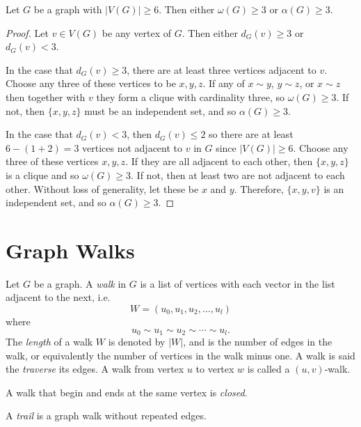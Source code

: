 \begin{thm}
    Let $G$ be a graph with $|V(G)| \geq 6$. Then either $\omega(G) \geq 3$ or $\alpha(G) \geq 3$.
\end{thm}

\begin{proof}
    Let $v \in V(G)$ be any vertex of $G$. Then either $d_G(v) \geq 3$ or $d_G(v) < 3$.

    In the case that $d_G(v) \geq 3$, there are at least three vertices adjacent to $v$. Choose any three of these vertices to be $x, y, z$. If any of $x \sim y$, $y \sim z$, or $x \sim z$ then together with $v$ they form a clique with cardinality three, so $\omega(G) \geq 3$. If not, then $\{x, y, z\}$ must be an independent set, and so $\alpha(G) \geq 3$.

    In the case that $d_G(v) < 3$, then $d_G(v) \leq 2$ so there are at least $6 - (1 + 2) = 3$ vertices not adjacent to $v$ in $G$ since $|V(G)| \geq 6$. Choose any three of these vertices $x, y, z$. If they are all adjacent to each other, then $\{x, y, z\}$ is a clique and so $\omega(G) \geq 3$. If not, then at least two are not adjacent to each other. Without loss of generality, let these be $x$ and $y$. Therefore, $\{x, y, v\}$ is an independent set, and so $\alpha(G) \geq 3$.
\end{proof}

\section{Graph Walks}

\begin{defn}
    Let $G$ be a graph. A \emph{walk} in $G$ is a list of vertices with each vector in the list adjacent to the next, i.e. \[W = (u_0, u_1, u_2, \ldots, u_l)\] where \[u_0 \sim u_1 \sim u_2 \sim \cdots \sim u_l.\] The \emph{length} of a walk $W$ is denoted by $|W|$, and is the number of edges in the walk, or equivalently the number of vertices in the walk minus one. A walk is said the \emph{traverse} its edges. A walk from vertex $u$ to vertex $w$ is called a $(u, v)$-walk.
\end{defn}

\begin{defn}
    A walk that begin and ends at the same vertex is \emph{closed}.
\end{defn}

\begin{defn}
    A \emph{trail} is a graph walk without repeated edges.
\end{defn}

